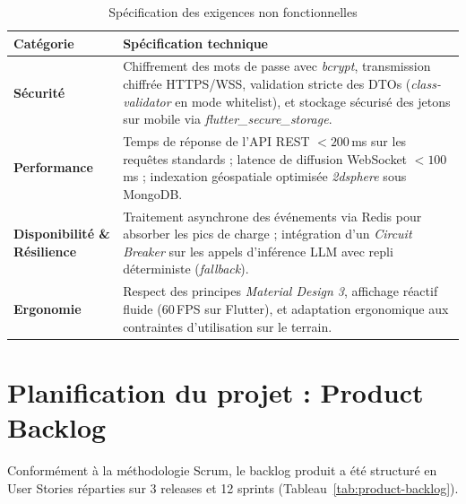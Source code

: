 \begin{table}[H]
\centering
\begin{tabular}{|p{3.5cm}|p{10.5cm}|}
\hline
\textbf{Cat\'egorie} & \textbf{Sp\'ecification technique} \\
\hline
\textbf{S\'ecurit\'e} & Chiffrement des mots de passe avec \textit{bcrypt}, transmission chiffr\'ee HTTPS/WSS, validation stricte des DTOs (\textit{class-validator} en mode whitelist), et stockage s\'ecuris\'e des jetons sur mobile via \textit{flutter\_secure\_storage}. \\
\hline
\textbf{Performance} & Temps de r\'eponse de l'API REST $< 200$\,ms sur les requ\^etes standards ; latence de diffusion WebSocket $< 100$\,ms ; indexation g\'eospatiale optimis\'ee \textit{2dsphere} sous MongoDB. \\
\hline
\textbf{Disponibilit\'e \& R\'esilience} & Traitement asynchrone des \'ev\'enements via Redis pour absorber les pics de charge ; int\'egration d'un \textit{Circuit Breaker} sur les appels d'inf\'erence LLM avec repli d\'eterministe (\textit{fallback}). \\
\hline
\textbf{Ergonomie} & Respect des principes \textit{Material Design 3}, affichage r\'eactif fluide ($60$\,FPS sur Flutter), et adaptation ergonomique aux contraintes d'utilisation sur le terrain. \\
\hline
\end{tabular}
\caption{Sp\'ecification des exigences non fonctionnelles}
\label{tab:non-fonct}
\end{table}

\section{Planification du projet : Product Backlog}
Conform\'ement \`a la m\'ethodologie Scrum, le backlog produit a \'et\'e structur\'e en User Stories r\'eparties sur 3 releases et 12 sprints (Tableau~\ref{tab:product-backlog}).


